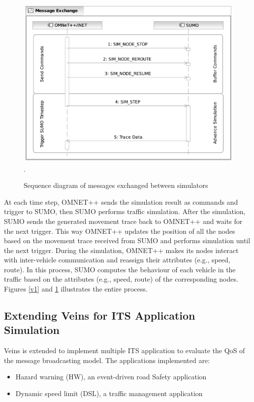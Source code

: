 \begin{figure}[H]
    \centering
    \includegraphics[width=12cm]{Framework/Images/veins2.png}.
    \caption{ Sequence diagram of messages exchanged between simulators \cite{veins}}
    \label{v2}
\end{figure}

At each time step, OMNET++ sends the simulation result as commands and trigger to SUMO, then SUMO performs traffic simulation. After the simulation, SUMO sends the generated movement trace back to OMNET++ and waits for the next trigger. This way OMNET++ updates the position of all the nodes based on the movement trace received from SUMO and performs simulation until the next trigger. During the simulation, OMNET++ makes its nodes interact with inter-vehicle communication and reassign their attributes (e.g., speed, route). In this process, SUMO computes the behaviour of each vehicle in the traffic based on the attributes (e.g., speed, route) of the corresponding nodes. Figures \ref{v1} and \ref{v2} illustrates the entire process.


\subsection{Extending Veins for ITS Application Simulation}
Veins is extended to implement multiple ITS application to evaluate the  QoS of the message broadcasting model. The applications implemented are:
\begin{itemize}
    \item Hazard warning (HW), an event-driven road Safety application
    \item Dynamic speed limit (DSL), a traffic management application
\end{itemize}

